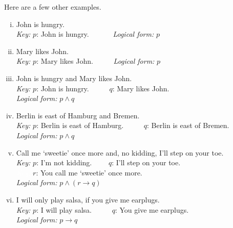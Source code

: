 \documentclass[nobib,nofonts]{tufte-handout}
\begin{document}
Here are a few other examples.
\begin{enumerate}[(i)]
  \item John is hungry. \\
    \emph{Key:} $p$: John is hungry. \ \ \ \ \ \
    \emph{Logical form:} $p$

  \item Mary likes John.\\
      \emph{Key:} $p$: Mary likes John. \ \ \ \ \
      \emph{Logical form:} $p$

  \item John is hungry and Mary likes John.\\
        \emph{Key:}
          $p$: John is hungry. \ \ \ \ \
          $q$: Mary likes John. \\
        \emph{Logical form:} $p \wedge q$

  \item Berlin is east of Hamburg and Bremen.\\
        \emph{Key:}
        $p$: Berlin is east of Hamburg. \ \ \ \ \
        $q$: Berlin is east of Bremen.\\
        \emph{Logical form:} $p \wedge q$

  \item Call me `sweetie' once more and, no kidding, I'll step on your toe.\\
        \emph{Key:}
        $p$: I'm not kidding. \ \ \ \
        $q$: I'll step on your toe. \\
        \textcolor{white}{\emph{Key:}} $r$: You call me `sweetie' once more.\\
        \emph{Logical form:} $p \wedge (r \rightarrow q)$

  \item  I will only play salsa, if you give me earplugs.\\
        \emph{Key:}
                $p$: I will play salsa. \ \ \ \ \
                $q$: You give me earplugs.\\
        \emph{Logical form:} $p \rightarrow q$
\end{enumerate}
\end{document}
